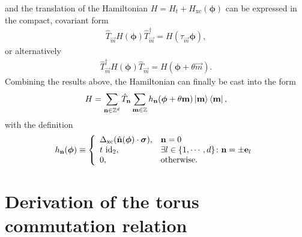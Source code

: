 \documentclass[
    10pt,
    aps,
    prb,
	longbibliography,
    twocolumn,
    floatfix,
    superscriptaddress,
]{revtex4-2}
\begin{document}
and the translation of the Hamiltonian $H = H_t + H_\mathrm{xc}(\boldsymbol{\phi})$ can  be expressed in the compact, covariant form
\begin{align}
\hat{T}_\vec{m}	H( \boldsymbol{\phi} )\hat{T}_\vec{m}^\dagger
 = H( \tau_\vec{m}\boldsymbol{\phi} ) ,
\end{align}
or alternatively
\begin{align}
	\hat{T}_\vec{m}^\dagger	H( \boldsymbol{\phi} )\hat{T}_\vec{m}
	 = H( \boldsymbol{\phi} +  \theta\vec{m} ) .
	\end{align}
Combining the results above, the Hamiltonian can finally be cast into the form
\begin{equation}
	H =  \sum_{\mathbf{n} \in \mathbb{Z}^d} \hat{T}_{\mathbf{n}}  \sum_{\mathbf{m} \in \mathbb{Z}} h_{\mathbf{n}}(  \boldsymbol{\phi} + \theta \mathbf{m}  ) \ket{ \mathbf{m}} \bra{ \mathbf{m}} ,
\end{equation}
with the definition
\begin{equation}
	h_{\mathbf{n}}(  \boldsymbol{\phi} )
	\equiv
	\left\lbrace
	\begin{array}{ll}
		\Delta_\mathrm{xc} (\hat{\mathbf{n}} ( \boldsymbol{\phi}) \cdot \boldsymbol{\sigma}) , & \mathbf{n} = 0  \\
		t~\mathrm{id}_2, & \exists l \in \lbrace 1,\cdots,d \rbrace\colon \mathbf{n} = \pm\mathbf{e}_l \\
		0, & \text{otherwise.}
		\end{array}
	\right.
\end{equation}


\section{Derivation of the torus commutation relation}
\label{app:commutation_relations}
\end{document}
